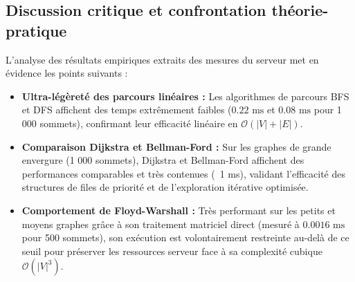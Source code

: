 \subsection{Discussion critique et confrontation théorie-pratique}
L'analyse des résultats empiriques extraits des mesures du serveur met en évidence les points suivants :
\begin{itemize}
    \item \textbf{Ultra-légèreté des parcours linéaires :} Les algorithmes de parcours BFS et DFS affichent des temps extrêmement faibles ($0.22\text{ ms}$ et $0.08\text{ ms}$ pour 1 000 sommets), confirmant leur efficacité linéaire en $\mathcal{O}(|V| + |E|)$.
    \item \textbf{Comparaison Dijkstra et Bellman-Ford :} Sur les graphes de grande envergure (1 000 sommets), Dijkstra et Bellman-Ford affichent des performances comparables et très contenues (~1 ms), validant l'efficacité des structures de files de priorité et de l'exploration itérative optimisée.
    \item \textbf{Comportement de Floyd-Warshall :} Très performant sur les petits et moyens graphes grâce à son traitement matriciel direct (mesuré à $0.0016\text{ ms}$ pour 500 sommets), son exécution est volontairement restreinte au-delà de ce seuil pour préserver les ressources serveur face à sa complexité cubique $\mathcal{O}(|V|^3)$.
\end{itemize}
